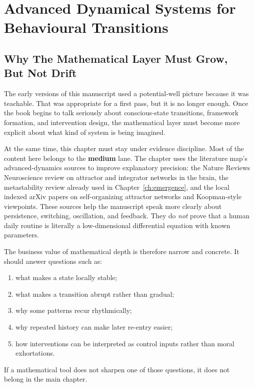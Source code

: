 \chapter{Advanced Dynamical Systems for Behavioural Transitions}
\label{ch:advanced-dynamics}

\section{Why The Mathematical Layer Must Grow, But Not Drift}

The early versions of this manuscript used a potential-well picture because it
was teachable. That was appropriate for a first pass, but it is no longer
enough. Once the book begins to talk seriously about conscious-state
transitions, framework formation, and intervention design, the mathematical
layer must become more explicit about what kind of system is being imagined.

At the same time, this chapter must stay under evidence discipline. Most of the
content here belongs to the \textbf{medium} lane. The chapter uses the
literature map's advanced-dynamics sources to improve explanatory precision:
the Nature Reviews Neuroscience review on attractor and integrator networks in
the brain, the metastability review already used in Chapter~\ref{ch:emergence},
and the local indexed arXiv papers on self-organizing attractor networks and
Koopman-style viewpoints. These sources help the manuscript speak more clearly
about persistence, switching, oscillation, and feedback. They do \emph{not}
prove that a human daily routine is literally a low-dimensional differential
equation with known parameters.

\begin{discussion}
The business value of mathematical depth is therefore narrow and concrete. It
should answer questions such as:
\begin{enumerate}[nosep]
  \item what makes a state locally stable;
  \item what makes a transition abrupt rather than gradual;
  \item why some patterns recur rhythmically;
  \item why repeated history can make later re-entry easier;
  \item how interventions can be interpreted as control inputs rather than
        moral exhortations.
\end{enumerate}
If a mathematical tool does not sharpen one of those questions, it does not
belong in the main chapter.
\end{discussion}

